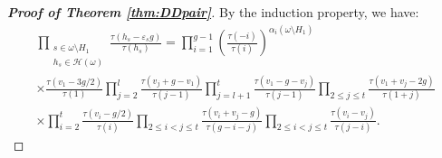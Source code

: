 \documentclass[11pt,letterpaper]{amsart}
\def\cch{\mathcal H}
\numberwithin{equation}{section}
\numberwithin{df}{section}
\begin{document}
\begin{proof}[\textbf{Proof of Theorem \ref{thm:DDpair}}]
 
 By the induction property, we have:
\begin{multline}\label{eq:inductionhyp}
\prod_{\substack{s\in\omega\setminus H_1\\h_s\in\cch(\omega)}}\frac{\tau(h_s-\varepsilon_s g)}{\tau(h_s)}= \prod_{i=1}^{g-1}\left(\frac{\tau(-i)}{\tau(i)}\right)^{\alpha_i(\omega\setminus H_1)}\\
\times\frac{\tau(v_1-3g/2)}{\tau(1)}\prod_{j=2}^l\frac{\tau(v_j+g-v_1)}{\tau(j-1)} \prod_{j=l+1}^{t} \frac{\tau(v_1-g-v_j)}{\tau(j-1)}
\prod_{2\leq j\leq t}\frac{\tau(v_1+v_j-2g)}{\tau(1+j)}
\\
\times\prod_{i=2}^{t}
\frac{\tau(v_i-g/2)}{\tau(i)}\prod_{2\leq i<j\leq t}  \frac{\tau(v_i+v_j-g)}{\tau(g-i-j)} \prod_{2\leq i<j\leq t} \frac{\tau(v_i-v_j)}{\tau(j-i)}.
\end{multline}


\end{proof}
\end{document}
